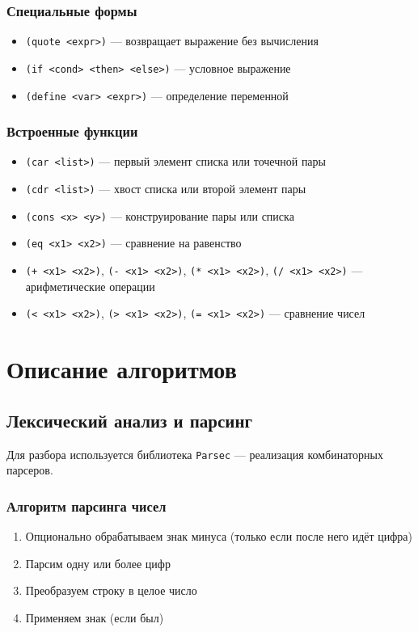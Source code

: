 \documentclass[a4paper,12pt]{article}
\begin{document}
\subsubsection{Специальные формы}
\begin{itemize}
    \item \texttt{(quote <expr>)} — возвращает выражение без вычисления
    \item \texttt{(if <cond> <then> <else>)} — условное выражение
    \item \texttt{(define <var> <expr>)} — определение переменной
\end{itemize}

\subsubsection{Встроенные функции}
\begin{itemize}
    \item \texttt{(car <list>)} — первый элемент списка или точечной пары
    \item \texttt{(cdr <list>)} — хвост списка или второй элемент пары
    \item \texttt{(cons <x> <y>)} — конструирование пары или списка
    \item \texttt{(eq <x1> <x2>)} — сравнение на равенство
    \item \texttt{(+ <x1> <x2>)}, \texttt{(- <x1> <x2>)}, \texttt{(* <x1> <x2>)}, \texttt{(/ <x1> <x2>)} — арифметические операции
    \item \texttt{(< <x1> <x2>)}, \texttt{(> <x1> <x2>)}, \texttt{(= <x1> <x2>)} — сравнение чисел
\end{itemize}

\section{Описание алгоритмов}

\subsection{Лексический анализ и парсинг}

Для разбора используется библиотека \texttt{Parsec} — реализация комбинаторных парсеров.

\subsubsection{Алгоритм парсинга чисел}
\begin{enumerate}
    \item Опционально обрабатываем знак минуса (только если после него идёт цифра)
    \item Парсим одну или более цифр
    \item Преобразуем строку в целое число
    \item Применяем знак (если был)
\end{enumerate}
\end{document}
